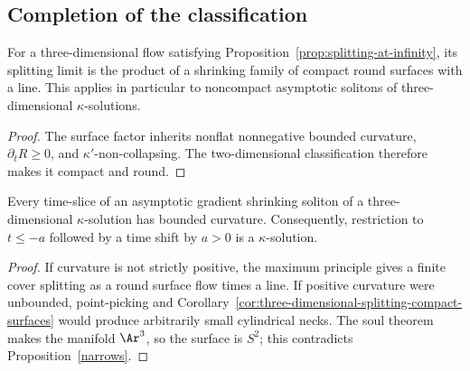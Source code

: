 \subsection{Completion of the classification}

\begin{corollary}\label{cor:three-dimensional-splitting-compact-surfaces}
\label{3Dinfty}
For a three-dimensional flow satisfying
Proposition~\ref{prop:splitting-at-infinity}, its splitting limit is
the product of a shrinking family of compact round surfaces with a
line. This applies in particular to noncompact asymptotic solitons
of three-dimensional $\kappa$-solutions.
\end{corollary}
\begin{proof}
\sketch
{}
The surface factor inherits nonflat nonnegative bounded curvature,
$\partial_tR\geq0$, and $\kappa'$-non-collapsing. The
two-dimensional classification therefore makes it compact and
round.
\end{proof}

\begin{corollary}\label{cor:three-dimensional-asymptotic-soliton-bounded-curvature}
\label{3DGSSkappa}
Every time-slice of an asymptotic gradient shrinking soliton of a
three-dimensional $\kappa$-solution has bounded curvature.
Consequently, restriction to $t\leq-a$ followed by a time shift by
$a>0$ is a $\kappa$-solution.
\end{corollary}
\begin{proof}
\sketch
{}
If curvature is not strictly positive, the maximum principle gives
a finite cover splitting as a round surface flow times a line. If
positive curvature were unbounded, point-picking and
Corollary~\ref{cor:three-dimensional-splitting-compact-surfaces}
would produce arbitrarily small cylindrical necks. The soul theorem
makes the manifold $\Ar^3$, so the surface is $S^2$; this
contradicts Proposition~\ref{narrows}.
\end{proof}

